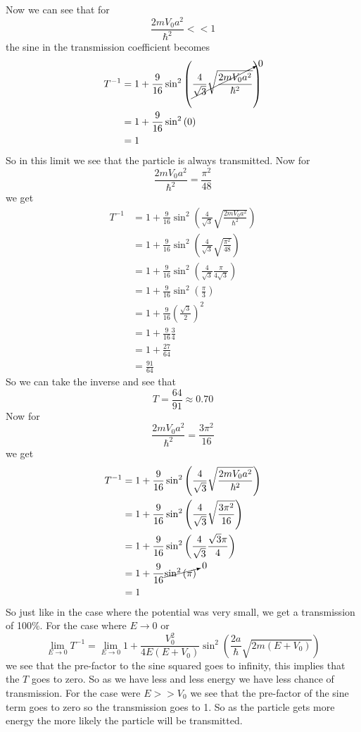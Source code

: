 \documentclass[11pt]{article}
\numberwithin{equation}{section}
\begin{document}
Now we can see that for 
$$\frac{2mV_0a^2}{\hbar^2}<<1$$
the sine in the transmission coefficient becomes 
\begin{align*}
T^{-1} &= 1+\frac{9}{16}\sin^2\left(\cancelto{0}{\frac{4}{\sqrt{3}}\sqrt{\frac{2mV_0a^2}{\hbar^2}}}\right)\\
&= 1+\frac{9}{16}\sin^2\left(0\right)\\
&= 1
\end{align*}
So in this limit we see that the particle is always transmitted. Now for 
$$\frac{2mV_0a^2}{\hbar^2} = \frac{\pi^2}{48}$$
we get
\begin{align*}
T^{-1} &= 1+\frac{9}{16}\sin^2\left(\frac{4}{\sqrt{3}}\sqrt{\frac{2mV_0a^2}{\hbar^2}}\right)\\
&= 1+\frac{9}{16}\sin^2\left(\frac{4}{\sqrt{3}}\sqrt{\frac{\pi^2}{48}}\right)\\
&= 1+\frac{9}{16}\sin^2\left(\frac{4}{\sqrt{3}}\frac{\pi}{4\sqrt{3}}\right)\\
&= 1+\frac{9}{16}\sin^2\left(\frac{\pi}{3}\right)\\
&= 1+\frac{9}{16}\left(\frac{\sqrt{3}}{2}\right)^2\\
&= 1+\frac{9}{16}\frac{3}{4}\\
&= 1+\frac{27}{64}\\
&= \frac{91}{64}
\end{align*}
So we can take the inverse and see that 
$$T = \frac{64}{91}\approx0.70$$
Now for 
$$\frac{2mV_0a^2}{\hbar^2} = \frac{3\pi^2}{16}$$
we get
\begin{align*}
T^{-1} &= 1+\frac{9}{16}\sin^2\left(\frac{4}{\sqrt{3}}\sqrt{\frac{2mV_0a^2}{\hbar^2}}\right)\\
&= 1+\frac{9}{16}\sin^2\left(\frac{4}{\sqrt{3}}\sqrt{\frac{3\pi^2}{16}}\right)\\
&= 1+\frac{9}{16}\sin^2\left(\frac{4}{\sqrt{3}}\frac{\sqrt{3}\pi}{4}\right)\\
&= 1+\frac{9}{16}\cancelto{0}{\sin^2\left(\pi\right)}\\
&= 1
\end{align*}
So just like in the case where the potential was very small, we get a transmission of 100\%. For the case where $E\rightarrow 0$ or
$$\lim_{E\rightarrow 0} T^{-1} = \lim_{E\rightarrow 0} 1+\frac{V_0^2}{4E(E+V_0)}\sin^2\left(\frac{2a}{\hbar}\sqrt{2m(E+V_0)}\right)$$
we see that the pre-factor to the sine squared goes to infinity, this implies that the $T$ goes to zero. So as we have less and less energy we have less chance of transmission. For the case were $E>>V_0$ we see that the pre-factor of the sine term goes to zero so the transmission goes to 1. So as the particle gets more energy the more likely the particle will be transmitted.
\end{document}
